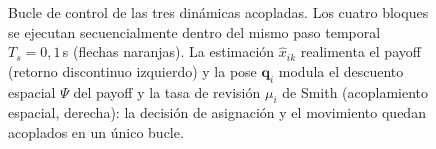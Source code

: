 \begin{figure}[htbp]
\caption[Bucle de control de las tres dinámicas acopladas]%
{Bucle de control de las tres dinámicas acopladas. Los cuatro bloques se ejecutan
secuencialmente dentro del mismo paso temporal $T_s = 0{,}1$\,s (flechas naranjas). La
estimación $\hat{x}_{ik}$ realimenta el payoff (retorno discontinuo izquierdo) y la
pose $\mathbf{q}_i$ modula el descuento espacial $\Psi$ del payoff y la tasa de
revisión $\mu_i$ de Smith (acoplamiento espacial, derecha): la decisión de asignación
y el movimiento quedan acoplados en un único bucle.}
\viuownsource
\label{fig:loop}
\end{figure}
